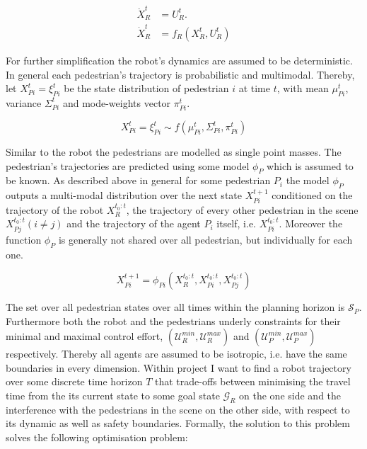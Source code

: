 \begin{align}
\label{eq:robot_dynamics}
\ddot{X}_R^t &= U_R^t. \\
\dot{X}_R^t &= f_R(X_R^t, U_R^t)
\end{align}

For further simplification the robot's dynamics are assumed to be deterministic.
\newline
In general each pedestrian's trajectory is probabilistic and multimodal. Thereby,  let $X_{Pi}^t = \xi_{Pi}^t$ be the state distribution of pedestrian $i$ at time $t$, with mean $\mu_{Pi}^t$, variance $\Sigma_{Pi}^t$ and mode-weights vector $\pi_{Pi}^t$. 

\begin{equation}
X_{Pi}^t = \xi_{Pi}^t \sim f(\mu_{Pi}^t, \Sigma_{Pi}^t, \pi_{Pi}^t)	
\end{equation}

Similar to the robot the pedestrians are modelled as single point masses. The pedestrian's trajectories are predicted using some model $\phi_P$ which is assumed to be known. As described above in general for some pedestrian $P_i$ the model $\phi_P$ outputs a multi-modal distribution over the next state $X_{Pi}^{t+1}$ conditioned on the trajectory of the robot $X_R^{t_0:t}$, the trajectory of every other pedestrian in the scene $X_{Pj}^{t_0:t} (i \neq j)$ and the trajectory of the agent $P_i$ itself, i.e. $X_{Pi}^{t_0:t}$. Moreover the function $\phi_P$ is generally not shared over all pedestrian, but individually for each one.

\begin{equation}
X_{Pi}^{t+1} = \phi_{Pi}(X_R^{t_0:t}, X_{Pi}^{t_0:t}, X_{Pj}^{t_0:t})	
\end{equation}

The set over all pedestrian states over all times within the planning horizon is $\mathcal{S}_P$.
\newline
Furthermore both the robot and the pedestrians underly constraints for their minimal and maximal control effort, $(\mathcal{U}_R^{min}, \mathcal{U}_R^{max})$ and $(\mathcal{U}_P^{min}, \mathcal{U}_P^{max})$ respectively. Thereby all agents are assumed to be isotropic, i.e. have the same boundaries in every dimension.
\newline
Within project \project I want to find a robot trajectory over some discrete time horizon $T$ that trade-offs between minimising the travel time from the its current state to some goal state $\mathcal{G}_R$ on the one side and the interference with the pedestrians in the scene on the other side, with respect to its dynamic as well as safety boundaries. Formally, the solution to this problem solves the following optimisation problem: 

